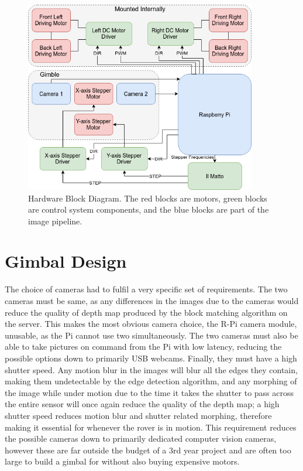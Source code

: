 \begin{figure}[H]
    \begin{center}
      \includegraphics[width=0.9\textwidth]{Figures/hardware.png}
      \caption[Hardware Block Diagram]{Hardware Block Diagram. The red blocks are motors, green blocks are control system components, and the blue blocks are part of the image pipeline.}
      \label{fig:hardware}
    \end{center}
\end{figure}

\section{Gimbal Design}

The choice of cameras had to fulfil a very specific set of requirements. The two cameras must be same, as any differences in the images due to the cameras would reduce the quality of depth map produced by the block matching algorithm on the server. This makes the most obvious camera choice, the R-Pi camera module, unusable, as the Pi cannot use two simultaneously. The two cameras must also be able to take pictures on command from the Pi with low latency, reducing the possible options down to primarily USB webcams. Finally, they must have a high shutter speed. Any motion blur in the images will blur all the edges they contain, making them undetectable by the edge detection algorithm, and any morphing of the image while under motion due to the time it takes the shutter to pass across the entire sensor will once again reduce the quality of the depth map; a high shutter speed reduces motion blur and shutter related morphing, therefore making it essential for whenever the rover is in motion. This requirement reduces the possible cameras down to primarily dedicated computer vision cameras, however these are far outside the budget of a 3rd year project and are often too large to build a gimbal for without also buying expensive motors.

